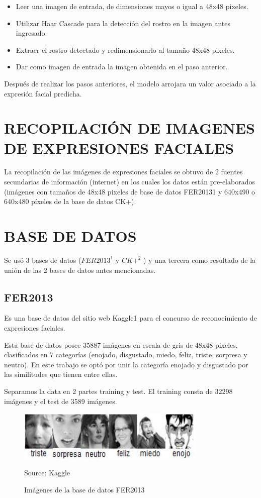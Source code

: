 \begin{itemize}
\item Leer una imagen de entrada, de dimensiones mayos o igual a 48x48 pixeles.
\item Utilizar Haar Cascade para la detección del rostro en la imagen antes ingresado.
\item Extraer el rostro detectado y redimensionarlo al tamaño 48x48 pixeles.
\item Dar como imagen de entrada la imagen obtenida en el paso anterior.
\end{itemize}
Después de realizar los pasos anteriores, el modelo arrojara un valor asociado a la
expresión facial predicha.

\section{RECOPILACIÓN DE IMAGENES DE EXPRESIONES
FACIALES}
La recopilación de las imágenes de expresiones faciales se obtuvo de 2 fuentes
secundarias de información (internet) en los cuales los datos están pre-elaborados
(imágenes con tamaños de 48x48 pixeles de base de datos FER20131 y 640x490 o
640x480 píxeles de la base de datos CK+).

\section{BASE DE DATOS}
Se usó 3 bases de datos ($FER2013^{1}$ y $CK+^{2}$ ) y una tercera como resultado de la
unión de las 2 bases de datos antes mencionadas.
\subsection{FER2013}
Es una base de datos del sitio web Kaggle{1} para el concurso de reconocimiento de
expresiones faciales.

Esta base de datos posee 35887 imágenes en escala de gris de 48x48 pixeles,
clasificados en 7 categorías (enojado, disgustado, miedo, feliz, triste, sorpresa y neutro).
En este trabajo se optó por unir la categoría enojado y disgustado por las similitudes que
tienen entre ellas.

Separamos la data en 2 partes training y test. El training consta de 32298 imágenes
y el test de 3589 imágenes.

\begin{figure}[H]
		\centering
		\includegraphics[width=90mm]{./Imagenes/imagenes_fer.png}
		\caption{Imágenes de la base de datos FER2013}
		Source: Kaggle
		\label{fig:imagenes_fer}
\end{figure}

